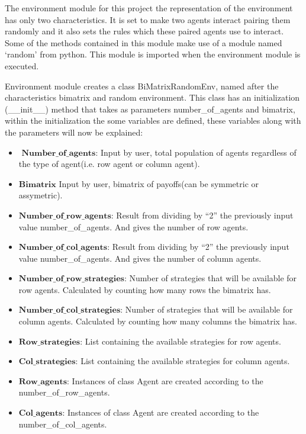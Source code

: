 \documentclass{article}
\begin{document}
The environment module for this project the representation of the environment has only two characteristics. It is set to make two agents interact pairing them randomly and it also sets the rules which these paired agents use to interact. Some of the methods contained in this module make use of a module named ‘random’ from python. This module is imported when the environment module is executed. 

Environment module creates a class BiMatrixRandomEnv, named after the characteristics bimatrix and random environment. This class has an initialization (\_\_init\_\_) method that takes as parameters number\_of\_agents and bimatrix, within the initialization the some variables are defined, these variables along with the parameters will now be explained:

\begin{itemize}
\item $\textbf{ Number\_of\_agents:}$ Input by user, total population of agents regardless of the type of agent(i.e. row agent or column agent).
\item $\textbf{Bimatrix}$ Input by user, bimatrix of payoffs(can be symmetric or assymetric).
\item $\textbf{Number\_of\_row\_agents:}$ Result from dividing by “2” the previously input value number\_of\_agents. And gives the number of row agents.
\item $\textbf{Number\_of\_col\_agents:}$ Result from dividing by “2” the previously input value number\_of\_agents. And gives the number of column agents.
\item $\textbf{Number\_of\_row\_strategies:}$ Number of strategies that will be available for row agents. Calculated by counting how many rows the bimatrix has.
\item $\textbf{Number\_of\_col\_strategies:}$ Number of strategies that will be available for column agents. Calculated by counting how many columns the bimatrix has.
\item $\textbf{Row\_strategies:}$ List containing the available strategies for row agents.
\item $\textbf{Col\_strategies:}$ List containing the available strategies for column agents.
\item $\textbf{Row\_agents:}$ Instances of class Agent are created according to the number\_of\_row\_agents. 
\item $\textbf{Col\_agents:}$ Instances of class Agent are created according to the number\_of\_col\_agents.
\end{itemize}
\end{document}
